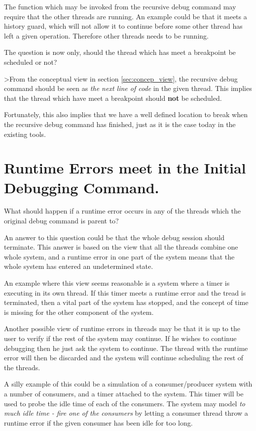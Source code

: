 \documentclass[]{article}
\begin{document}
The function which may be invoked from the recursive debug command may
require that the other threads are running. An example could be that it
meets a history guard, which will not allow it to continue before some
other thread has left a given operation. Therefore other threads needs to
be running.

The question is now only, should the thread which has meet a breakpoint be
scheduled or not?

>From the conceptual view in section \ref{sec:concep_view}, the recursive
debug command should be seen as \emph{the next line of code} in the given
thread. This implies that the thread which have meet a breakpoint should
\textbf{not} be scheduled.

Fortunately, this also implies that we have a well defined location to
break when the recursive debug command has finished, just as it is the case
today in the existing tools. 


\section{Runtime Errors meet in the Initial Debugging Command.}
What should happen if a runtime error occurs in any of the threads which
the original debug command is parent to?

An answer to this question could be that the whole debug session should
terminate. This answer is based on the view that all the threads combine
one whole system, and a runtime error in one part of the system means that
the whole system has entered an undetermined state.

An example where this view seems reasonable is a system where a timer is
executing in its own thread. If this timer meets a runtime error and the
tread is terminated, then a vital part of the system has stopped, and the
concept of time is missing for the other component of the system.

Another possible view of runtime errors in threads may be that it is up to
the user to verify if the rest of the system may continue. If he wishes to
continue debugging then he just ask the system to continue. The thread with
the runtime error will then be discarded and the system will continue
scheduling the rest of the threads.

A silly example of this could be a simulation of a consumer/producer system
with a number of consumers, and a timer attached to the system. This timer
will be used to probe the idle time of each of the consumers. The system
may model \emph{to much idle time - fire one of the consumers} by letting a
consumer thread throw a runtime error if the given consumer has been idle
for too long.
\end{document}
